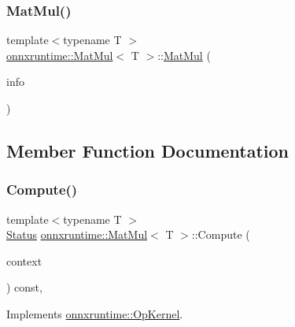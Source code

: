 \subsubsection{\texorpdfstring{Mat\+Mul()}{MatMul()}}
{\footnotesize\ttfamily template$<$typename T $>$ \\
\mbox{\hyperlink{classonnxruntime_1_1MatMul}{onnxruntime\+::\+Mat\+Mul}}$<$ T $>$\+::\mbox{\hyperlink{classonnxruntime_1_1MatMul}{Mat\+Mul}} (\begin{DoxyParamCaption}\item[{const \mbox{\hyperlink{classonnxruntime_1_1OpKernelInfo}{Op\+Kernel\+Info}} \&}]{info }\end{DoxyParamCaption})\hspace{0.3cm}{\ttfamily [inline]}}



\subsection{Member Function Documentation}
\mbox{\label{classonnxruntime_1_1MatMul_acec8f431deefacc14e73a10878edb52c}} 
\subsubsection{\texorpdfstring{Compute()}{Compute()}\hspace{0.1cm}{\footnotesize\ttfamily [1/2]}}
{\footnotesize\ttfamily template$<$typename T $>$ \\
\mbox{\hyperlink{classonnxruntime_1_1common_1_1Status}{Status}} \mbox{\hyperlink{classonnxruntime_1_1MatMul}{onnxruntime\+::\+Mat\+Mul}}$<$ T $>$\+::Compute (\begin{DoxyParamCaption}\item[{\mbox{\hyperlink{classonnxruntime_1_1OpKernelContext}{Op\+Kernel\+Context}} $\ast$}]{context }\end{DoxyParamCaption}) const\hspace{0.3cm}{\ttfamily [override]}, {\ttfamily [virtual]}}



Implements \mbox{\hyperlink{classonnxruntime_1_1OpKernel_a9eca8656a78b1b3ab9d3351a12798650}{onnxruntime\+::\+Op\+Kernel}}.

\mbox{\label{classonnxruntime_1_1MatMul_a49146234469a640b16f571d07d325b9c}} 
